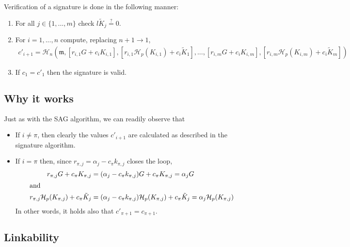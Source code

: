 Verification of a signature is done in the following manner:

\begin{enumerate}
    \item For all $j \in \{1,...,m\}$ check $l \tilde{K}_j \stackrel{?}{=} 0$.
	\item For \(i = 1, ..., n\) compute, replacing \(n + 1 \rightarrow 1\),\vspace{.175cm}
	\begin{align*}
	c'_{i+1} = \mathcal{H}_n(\mathfrak{m}, [r_{i, 1} G + c_i K_{i, 1}], [r_{i, 1} \mathcal{H}_p(K_{i, 1}) + c_i \tilde{K}_1], 
	..., [r_{i, m} G + c_i K_{i, m}], [r_{i, m} \mathcal{H}_p(K_{i, m}) + c_i \tilde{K}_m])
	\end{align*}

	\item If \(c_1 = c'_1\) then the signature is valid.
\end{enumerate}


\subsection*{Why it works}

Just as with the SAG algorithm, we can readily observe that

\begin{itemize}
    \item If \(i \ne \pi \), then clearly the values \(c'_{i + 1}\) are calculated as described in the signature algorithm.

    \item If \(i = \pi\) then, since \(r_{\pi, j} = \alpha_j - c_\pi k_{\pi, j} \) closes the loop,\vspace{.175cm}
    \begin{alignat*}{6}
        r_{\pi, j} G + c_\pi K_{\pi,j} &= (\alpha_j - c_\pi k_{\pi, j}) G + c_\pi K_{\pi,j} = \alpha_j G\\
        \intertext{and}
        r_{\pi, j} \mathcal{H}_p(K_{\pi, j}) + c_\pi \tilde{K}_j &= (\alpha_j - c_\pi k_{\pi, j}) \mathcal{H}_p(K_{\pi, j}) + c_\pi \tilde{K}_j = \alpha_j \mathcal{H}_p(K_{\pi, j})\\
    \end{alignat*}
    In other words, it holds also that \(c'_{\pi + 1} = c_{\pi+1}\).
\end{itemize}


\subsection*{Linkability}

